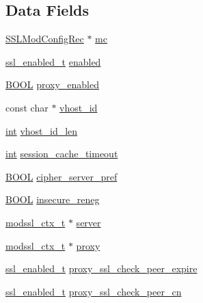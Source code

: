 \subsection*{Data Fields}
\begin{DoxyCompactItemize}
\item 
\hyperlink{structSSLModConfigRec}{S\+S\+L\+Mod\+Config\+Rec} $\ast$ \hyperlink{structSSLSrvConfigRec_a382532e50a922941e3c6945e4d71c0d0}{mc}
\item 
\hyperlink{group__MOD__SSL__PRIVATE_ga2a6d65d4ff2b1083702c82c09325c299}{ssl\+\_\+enabled\+\_\+t} \hyperlink{structSSLSrvConfigRec_a79b2e4b68e2efe964c8a0d1e715830f3}{enabled}
\item 
\hyperlink{pcre__internal_8h_a050c65e107f0c828f856a231f4b4e788}{B\+O\+OL} \hyperlink{structSSLSrvConfigRec_afb0fb864cd3a4a88542ec16809007def}{proxy\+\_\+enabled}
\item 
const char $\ast$ \hyperlink{structSSLSrvConfigRec_a0517c50274f512bac682d23e0143f46d}{vhost\+\_\+id}
\item 
\hyperlink{pcre_8txt_a42dfa4ff673c82d8efe7144098fbc198}{int} \hyperlink{structSSLSrvConfigRec_a50c4b7a1d9ffe1ffcfd03f6600103161}{vhost\+\_\+id\+\_\+len}
\item 
\hyperlink{pcre_8txt_a42dfa4ff673c82d8efe7144098fbc198}{int} \hyperlink{structSSLSrvConfigRec_ad2ddc7bf93ec43915b0c05d28a9ff6b7}{session\+\_\+cache\+\_\+timeout}
\item 
\hyperlink{pcre__internal_8h_a050c65e107f0c828f856a231f4b4e788}{B\+O\+OL} \hyperlink{structSSLSrvConfigRec_a8dca1370c92ffd4ea5e34b761450c1d5}{cipher\+\_\+server\+\_\+pref}
\item 
\hyperlink{pcre__internal_8h_a050c65e107f0c828f856a231f4b4e788}{B\+O\+OL} \hyperlink{structSSLSrvConfigRec_a1262d78cb95fe3c40b249f740abe88b8}{insecure\+\_\+reneg}
\item 
\hyperlink{structmodssl__ctx__t}{modssl\+\_\+ctx\+\_\+t} $\ast$ \hyperlink{structSSLSrvConfigRec_a7941dbc2f9fa504b3968a4afdc4b96fc}{server}
\item 
\hyperlink{structmodssl__ctx__t}{modssl\+\_\+ctx\+\_\+t} $\ast$ \hyperlink{structSSLSrvConfigRec_ab5c01b000d9e3d7f5553862022295fba}{proxy}
\item 
\hyperlink{group__MOD__SSL__PRIVATE_ga2a6d65d4ff2b1083702c82c09325c299}{ssl\+\_\+enabled\+\_\+t} \hyperlink{structSSLSrvConfigRec_a3788f2efa84d779174990b09c4c0abf3}{proxy\+\_\+ssl\+\_\+check\+\_\+peer\+\_\+expire}
\item 
\hyperlink{group__MOD__SSL__PRIVATE_ga2a6d65d4ff2b1083702c82c09325c299}{ssl\+\_\+enabled\+\_\+t} \hyperlink{structSSLSrvConfigRec_ab11280bea5de0b61733ba76e74d99f95}{proxy\+\_\+ssl\+\_\+check\+\_\+peer\+\_\+cn}

\end{DoxyCompactItemize}
